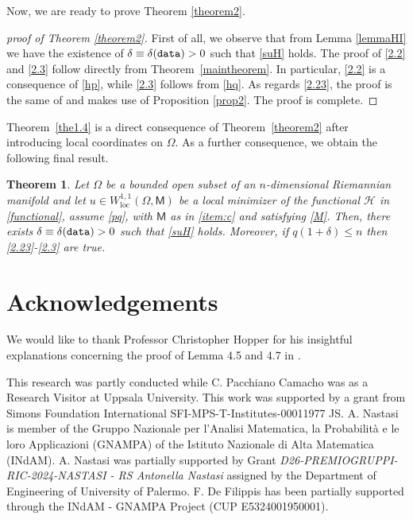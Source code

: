 \documentclass[a4paper]{amsart}
\def\loc{\operatorname{loc}}
\newtheorem{theorem}{Theorem}[section]
\theoremstyle{plain}  %
\numberwithin{equation}{section}
\newcommand{\mm}{\mathsf{M}}
\newcommand{\tx}[1]{\textnormal{\texttt{#1}}}
\def\loc{\operatorname{loc}}
\begin{document}
\noindent
Now, we are ready to prove Theorem \ref{theorem2}.
\begin{proof}[proof of Theorem \ref{theorem2}]
First of all, we observe that from Lemma \ref{lemmaHI} we have the existence of $\delta \equiv \delta(\tx{data})>0$ such that \eqref{suH} holds. The proof of \eqref{2.2} and \eqref{2.3} follow directly from Theorem~\ref{maintheorem}. In particular, \eqref{2.2} is a consequence of \eqref{hp}, while \eqref{2.3} follows from \eqref{hq}. As regards \eqref{2.23}, the proof is the same of \cite[Theorem 3]{DFM} and makes use of Proposition \ref{prop2}. The proof is complete. 
\end{proof}
\noindent
Theorem~\ref{the1.4} is a direct consequence of Theorem~\ref{theorem2} after introducing local coordinates on $\Omega$. As a further consequence, we obtain the following final result.
\begin{theorem}
Let $\Omega$ be a bounded open subset of an $n$-dimensional Riemannian manifold and        let $u \in W^{1,1}_{\loc}(\Omega, \mm)$ be a local minimizer of the functional $\mathcal{H}$ in \eqref{functional}, assume \eqref{pq}, with $\mm$ as in \ref{item:c} and satisfying \eqref{M}. Then, there exists $\delta \equiv \delta(\tx{data})>0$ such that \eqref{suH} holds. Moreover, if $q(1+\delta) \leq n$ then \eqref{2.23}-\eqref{2.3} are true.
\end{theorem}

\section*{Acknowledgements}

\noindent
We would like to thank Professor Christopher Hopper for his insightful explanations concerning the proof of Lemma 4.5 and 4.7 in \cite{H}.

This research was partly conducted while C. Pacchiano Camacho was as a Research Visitor at Uppsala University. This work was supported by a grant from Simons Foundation International SFI-MPS-T-Institutes-00011977 JS. \newline
A. Nastasi is member of the Gruppo Nazionale per l’Analisi
Matematica, la Probabilit\`{a} e le loro Applicazioni (GNAMPA) of the Istituto
Nazionale di Alta Matematica (INdAM).
A. Nastasi was partially supported by Grant \textit{D26-PREMIOGRUPPI-RIC-2024-NASTASI - RS Antonella Nastasi}  assigned by the Department of Engineering of University of Palermo. \newline
F. De Filippis has been partially supported through the INdAM - GNAMPA Project (CUP E5324001950001).
\end{document}
